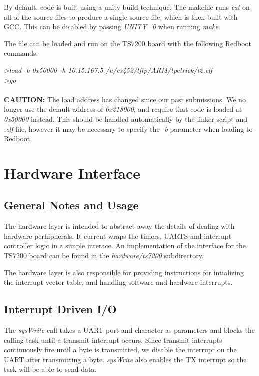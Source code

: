 \documentclass[twoside,a4paper]{refart}
\begin{document}
By default, code is built using a unity build technique. The makefile runs \textit{cat} on all of the source files to produce a single source file, which is then built with GCC. This can be disabled by passing \textit{UNITY=0} when running \textit{make}.

The file can be loaded and run on the TS7200 board with the following Redboot commands:

\textit{\textgreater load -b 0x50000 -h 10.15.167.5 /u/cs452/tftp/ARM/tpetrick/t2.elf}\\
\textit{\textgreater go}\\\\

\textbf{CAUTION:}  The load address has changed since our past submissions. We no longer use the default address of \textit{0x218000}, and require that code is loaded at \textit{0x50000} instead. This should be handled automatically by the linker script and \textit{.elf} file, however it may be necessary to specify the \textit{-b} parameter when loading to Redboot.

\section{Hardware Interface}
\subsection{General Notes and Usage}
The hardware layer is intended to abstract away the details of dealing with hardware perhipherals. It current wraps the timers, UARTS and interrupt controller logic in a simple interace. An implementation of the interface for the TS7200 board can be found in the \textit{hardware/ts7200} subdirectory.

The hardware layer is also responsible for providing instructions for intializing the interrupt vector table, and handling software and hardware interrupts.

\subsection{Interrupt Driven I/O}
The \textit{sysWrite} call takes a UART port and character as parameters and blocks the calling task until a transmit interrupt occurs. Since transmit interrupts continuously fire until a byte is transmitted, we disable the interrupt on the UART after transmitting a byte. \textit{sysWrite} also enables the TX interrupt so the task will be able to send data.
\end{document}

